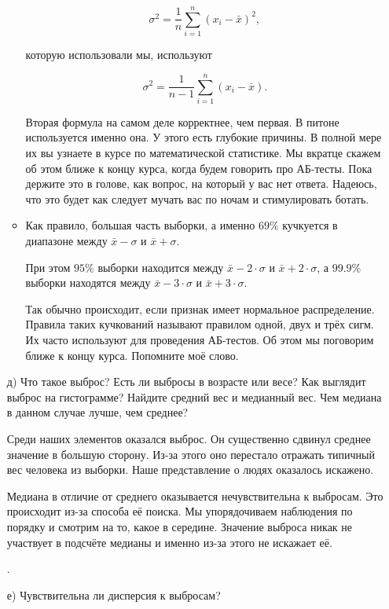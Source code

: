 \documentclass[12pt, a4paper, oneside]{article}
\begin{document}
\begin{enumerate}
\begin{itemize}
	\[ 
	\sigma^2 = \frac{1}{n} \sum_{i=1}^n (x_i - \bar x)^2,
	\]
	
	которую использовали мы, используют 
	
	\[ 
	\sigma^2 = \frac{1}{n-1} \sum_{i=1}^n (x_i - \bar x).
	\]
	
	Вторая формула на самом деле корректнее, чем первая.  В питоне используется именно она. У этого есть глубокие причины. В полной мере их вы узнаете в курсе по математической статистике. Мы вкратце скажем об этом ближе к концу курса, когда будем говорить про АБ-тесты. Пока держите это в голове, как вопрос, на который у вас нет ответа. Надеюсь, что это будет как следует мучать вас по ночам и стимулировать ботать. 
	
	\item Как правило, большая часть выборки, а именно $69\%$ кучкуется в диапазоне между $\bar x - \sigma$ и $\bar x + \sigma$.  
	
	При этом $95 \%$ выборки находится между $\bar x - 2 \cdot \sigma$ и $\bar x + 2 \cdot \sigma$, а $99.9\%$ выборки находятся между $\bar x - 3 \cdot \sigma$ и $\bar x + 3 \cdot \sigma$. 
	
	Так обычно происходит, если признак имеет нормальное распределение. Правила таких кучкований называют правилом одной, двух и трёх сигм. Их часто используют для проведения АБ-тестов. Об этом мы поговорим ближе к концу курса. Попомните моё слово. 
	
\end{itemize}


\item[д)] Что такое выброс? Есть ли выбросы в возрасте или весе? Как выглядит выброс на гистограмме? Найдите средний вес и медианный вес. Чем медиана в данном случае лучше, чем среднее?



Среди наших элементов оказался выброс. Он существенно сдвинул среднее значение в большую сторону. Из-за этого оно перестало отражать типичный вес человека из выборки. Наше представление о людях оказалось искажено. 

Медиана в отличие от среднего оказывается нечувствительна к выбросам. Это происходит из-за способа её поиска. Мы упорядочиваем наблюдения по порядку и смотрим на то, какое в середине. Значение выброса никак не участвует в подсчёте медианы и именно из-за этого не искажает её. 

. 
\item[е)] Чувствительна ли дисперсия к выбросам?


\end{enumerate}
\end{document}

